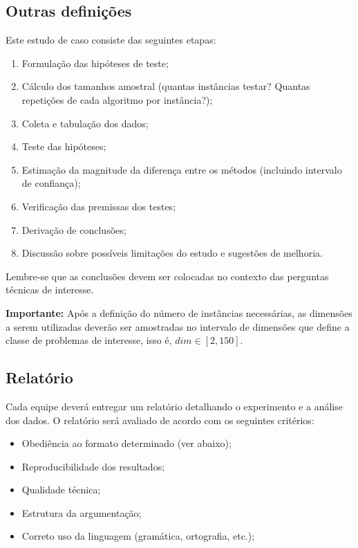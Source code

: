 \documentclass[11pt,twoside,printwatermark=false]{pinp}
\providecommand{\tightlist}{%
  \setlength{\itemsep}{0pt}\setlength{\parskip}{0pt}}
\begin{document}
\subsection{Outras definições}\label{outras-definicoes}

Este estudo de caso consiste das seguintes etapas:

\begin{enumerate}
\def\labelenumi{\arabic{enumi}.}
\tightlist
\item
  Formulação das hipóteses de teste;
\item
  Cálculo dos tamanhos amostral (quantas instâncias testar? Quantas
  repetições de cada algoritmo por instância?);
\item
  Coleta e tabulação dos dados;
\item
  Teste das hipóteses;
\item
  Estimação da magnitude da diferença entre os métodos (incluindo
  intervalo de confiança);
\item
  Verificação das premissas dos testes;
\item
  Derivação de conclusões;
\item
  Discussão sobre possíveis limitações do estudo e sugestões de
  melhoria.
\end{enumerate}

Lembre-se que as conclusões devem ser colocadas no contexto das
perguntas técnicas de interesse.

\textbf{Importante:} Após a definição do número de instâncias
necessárias, as dimensões a serem utilizadas deverão ser amostradas no
intervalo de dimensões que define a classe de problemas de interesse,
isso é, \(dim\in\left[2,150\right]\).

\subsection{Relatório}\label{relatorio}

Cada equipe deverá entregar um relatório detalhando o experimento e a
análise dos dados. O relatório será avaliado de acordo com os seguintes
critérios:

\begin{itemize}
\tightlist
\item
  Obediência ao formato determinado (ver abaixo);
\item
  Reproducibilidade dos resultados;
\item
  Qualidade técnica;
\item
  Estrutura da argumentação;
\item
  Correto uso da linguagem (gramática, ortografia, etc.);
\end{itemize}
\end{document}
